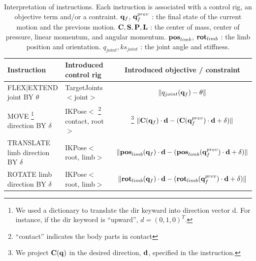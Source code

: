 \begin{table}[t]
  \center
  \scriptsize
  \caption{
    Interpretation of instructions. Each instruction is
    associated with a control rig, an objective
    term and/or a contraint.
    $\mathbf{q}_f$, $\mathbf{q}^{prev}_f$ : the final state of the current motion
    and the previous motion.
    $\mathbf{C}, \mathbf{S}, \mathbf{P},\mathbf{L}$ : the center of mass, center of pressure, 
    linear momentum, and angular momentum.  
    $\mathbf{pos}_{limb}$, $\mathbf{rot}_{limb}$ : the limb position and orientation. 
    $q_{joint}, ks_{joint}$ : the joint angle and stiffness.
    \hspace*{\fill}
  } 
  \begin{minipage}{\textwidth}
    \begin{tabular}{ | p{3.7cm} | p{3.7cm} | c |}
      \hline
      \textbf{Instruction }
      & \textbf{Introduced control rig }
      & \textbf{Introduced objective / constraint} \\ \hline

      FLEX$|$EXTEND joint BY $\theta$ 
      & TargetJoints$<$joint$>$
      & $ \| q_{joint} (\mathbf{q}_f) - \theta \|$ \\ \hline

      MOVE 
      \footnote{We used a dictionary to translate the dir keyward into
        direction vector d. For instance, if the dir keyword is ``upward'', $d
        = (0, 1, 0)^T$. }
      direction BY $\delta$
      & IKPose$<$
      \footnote{``contact'' indicates the body parts in contact}
      contact, root$>$
      &  
      \footnote{We project $\mathbf{C}(\mathbf{q})$ in the desired direction, $\mathbf{d}$,
        specified in the instruction.} 
      $ \|\mathbf{C}(\mathbf{q}_f) \cdot \mathbf{d} - (\mathbf{C}(\mathbf{q}^{prev}_f) \cdot \mathbf{d} + \delta)\|$ \\ \hline

      TRANSLATE limb direction BY $\delta$
      & IKPose$<$root, limb$>$
      & $ \|\mathbf{pos}_{limb}(\mathbf{q}_f) \cdot \mathbf{d} - (\mathbf{pos}_{limb}(\mathbf{q}^{prev}_f) \cdot \mathbf{d} + \delta)\|$ \\ \hline

      ROTATE limb direction BY $\delta$
      & IKPose$<$root, limb$>$
      & $ \|\mathbf{rot}_{limb}(\mathbf{q}_f) \cdot \mathbf{d} - (\mathbf{rot}_{limb}(\mathbf{q}^{prev}_f) \cdot \mathbf{d} + \delta)\|$ \\ \hline


\end{tabular}
\end{minipage}
\end{table}
